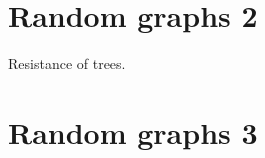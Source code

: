 \documentclass[11pt,fleqn]{book} %
\begin{document}
\newpage 
 \chapter{Random graphs 2}


\begin{problem}
  Resistance of trees. 
\end{problem}











\newpage 
    \chapter{Random graphs 3}
\kapiteldatum{}
\end{document}
